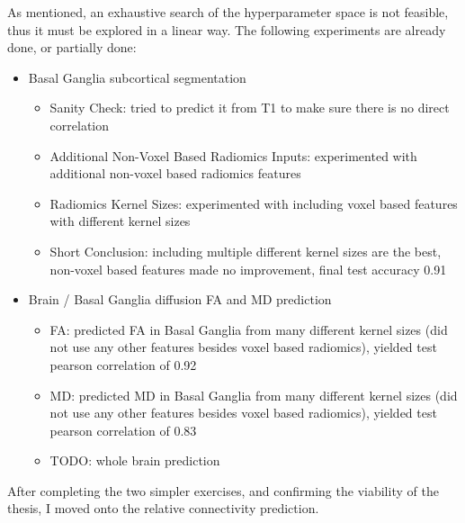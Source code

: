 As mentioned, an exhaustive search of the hyperparameter space is not feasible, thus it must be explored in a linear way. The following experiments are already done, or partially done:

\begin{itemize}
  \item Basal Ganglia subcortical segmentation
  \begin{itemize}
    \item Sanity Check: tried to predict it from T1 to make sure there is no direct correlation
    \item Additional Non-Voxel Based Radiomics Inputs: experimented with additional non-voxel based radiomics features
    \item Radiomics Kernel Sizes: experimented with including voxel based features with different kernel sizes
    \item Short Conclusion: including multiple different kernel sizes are the best, non-voxel based features made no improvement, final test accuracy 0.91
  \end{itemize}
  \item Brain / Basal Ganglia diffusion \ac{FA} and \ac{MD} prediction
  \begin{itemize}
    \item \ac{FA}: predicted \ac{FA} in Basal Ganglia from many different kernel sizes (did not use any other features besides voxel based radiomics), yielded test pearson correlation of 0.92
    \item \ac{MD}: predicted \ac{MD} in Basal Ganglia from many different kernel sizes (did not use any other features besides voxel based radiomics), yielded test pearson correlation of 0.83
    \item TODO: whole brain prediction
  \end{itemize}
\end{itemize}

After completing the two simpler exercises, and confirming the viability of the thesis, I moved onto the relative connectivity prediction.







